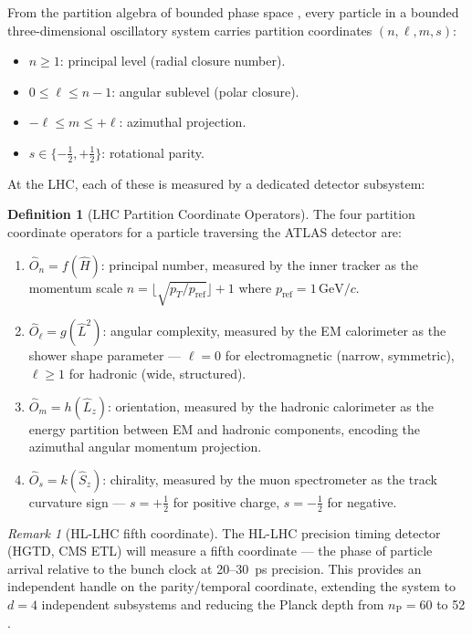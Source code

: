 \documentclass[twocolumn,10pt,a4paper]{article}
\theoremstyle{thmstyle}
\theoremstyle{definition}
\newtheorem{definition}[theorem]{Definition}
\theoremstyle{remark}
\newtheorem{remark}[theorem]{Remark}
\newcommand{\nP}{n_{\mathrm{P}}}
\begin{document}
From the partition algebra of bounded phase space
\citep{companion:math}, every particle in a bounded three-dimensional
oscillatory system carries partition coordinates $(n, \ell, m, s)$:
\begin{itemize}[nosep]
\item $n \geq 1$: principal level (radial closure number).
\item $0 \leq \ell \leq n-1$: angular sublevel (polar closure).
\item $-\ell \leq m \leq +\ell$: azimuthal projection.
\item $s \in \{-\tfrac{1}{2}, +\tfrac{1}{2}\}$: rotational parity.
\end{itemize}

At the LHC, each of these is measured by a dedicated detector subsystem:

\begin{definition}[LHC Partition Coordinate Operators]
\label{def:operators}
The four partition coordinate operators for a particle traversing the
ATLAS detector are:
\begin{enumerate}[nosep,label=(\roman*)]
\item $\hat{O}_n = f(\hat{H})$: principal number, measured by the
inner tracker as the momentum scale
$n = \lfloor\sqrt{p_T/p_{\mathrm{ref}}}\rfloor + 1$
where $p_{\mathrm{ref}} = 1\,\mathrm{GeV}/c$.
\item $\hat{O}_\ell = g(\hat{L}^2)$: angular complexity, measured by the
EM calorimeter as the shower shape parameter — $\ell = 0$ for
electromagnetic (narrow, symmetric), $\ell \geq 1$ for hadronic
(wide, structured).
\item $\hat{O}_m = h(\hat{L}_z)$: orientation, measured by the hadronic
calorimeter as the energy partition between EM and hadronic components,
encoding the azimuthal angular momentum projection.
\item $\hat{O}_s = k(\hat{S}_z)$: chirality, measured by the muon
spectrometer as the track curvature sign — $s = +\tfrac{1}{2}$ for
positive charge, $s = -\tfrac{1}{2}$ for negative.
\end{enumerate}
\end{definition}

\begin{remark}[HL-LHC fifth coordinate]
The HL-LHC precision timing detector (HGTD, CMS ETL) will measure a fifth
coordinate — the phase of particle arrival relative to the bunch clock
at 20--30~ps precision. This provides an independent handle on the
parity/temporal coordinate, extending the system to $d = 4$ independent
subsystems and reducing the Planck depth from $\nP = 60$ to 52
\citep{companion:planck}.
\end{remark}
\end{document}
